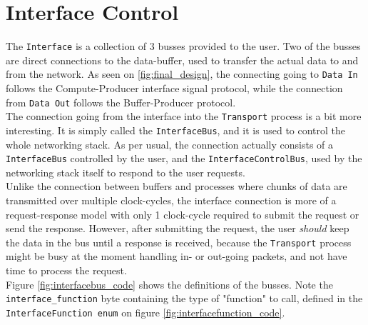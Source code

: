 \section{Interface Control}
The \texttt{Interface} is a collection of 3 busses provided to the user. Two of
the busses are direct connections to the data-buffer, used to transfer the
actual data to and from the network. As seen on \ref{fig:final_design}, the
connecting going to \texttt{Data In} follows the Compute-Producer interface
signal protocol, while the connection from \texttt{Data Out} follows the
Buffer-Producer protocol.\\
The connection going from the interface into the \texttt{Transport} process is
a bit more interesting. It is simply called the \texttt{InterfaceBus}, and it
is used to control the whole networking stack. As per usual, the connection
actually consists of a \texttt{InterfaceBus} controlled by the user, and the
\texttt{InterfaceControlBus}, used by the networking stack itself to respond to
the user requests.\\
Unlike the connection between buffers and processes where chunks of data are
transmitted over multiple clock-cycles, the interface connection is more of a
request-response model with only 1 clock-cycle required to submit the request
or send the response. However, after submitting the request, the user
\textit{should} keep the data in the bus until a response is received, because
the \texttt{Transport} process might be busy at the moment handling in- or
out-going packets, and not have time to process the request.\\
Figure \ref{fig:interfacebus_code} shows the definitions of the busses. Note
the \texttt{interface\_function} byte containing the type of "function" to
call, defined in the \texttt{InterfaceFunction enum} on figure
\ref{fig:interfacefunction_code}.


